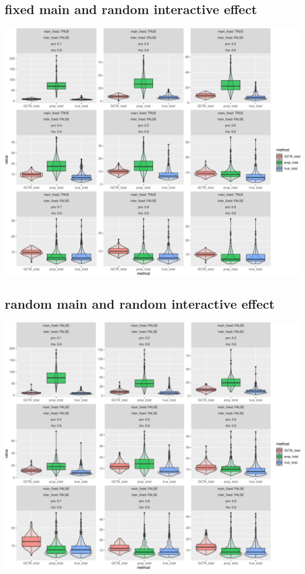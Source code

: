 \documentclass[]{article}
\begin{document}
\subsection{fixed main and random interactive
effect}\label{fixed-main-and-random-interactive-effect}

\includegraphics{Simulation_report_chi_resamle_files/figure-latex/fixed random-1.pdf}

\subsection{random main and random interactive
effect}\label{random-main-and-random-interactive-effect}

\includegraphics{Simulation_report_chi_resamle_files/figure-latex/random random-1.pdf}
\end{document}
